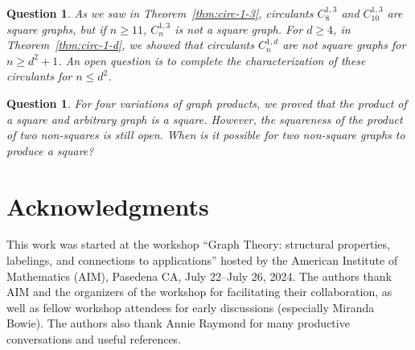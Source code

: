 \documentclass{article}
\newtheorem{ques}[theorem]{Question}
\theoremstyle{definition}
\begin{document}
\begin{ques} 
As we saw in Theorem~\ref{thm:circ-1-3}, circulants $C_8^{1,3}$ and $C_{10}^{1,3}$ are square graphs, but if $n\geq 11$, $C_{n}^{1,3}$ is not a square graph. 
For $d\geq 4$, in Theorem~\ref{thm:circ-1-d}, we showed that circulants $C_n^{1,d}$ are not square graphs for $n\geq d^2+1$. An open question is to complete the characterization of these circulants for $n\leq d^2$. 
\end{ques}

\begin{ques}
For four variations of graph products, we proved that the product of a square and arbitrary graph is a square.  However, the squareness of the product of two non-squares is still open.  When is it possible for two non-square graphs to produce a square?
\end{ques}




\section*{Acknowledgments}
This work was started at the workshop ``Graph Theory: structural properties, labelings, and connections to applications'' hosted by the American Institute of Mathematics (AIM), Pasedena CA, July 22--July 26, 2024. The authors thank AIM and the organizers of the workshop for facilitating their collaboration, as well as fellow workshop attendees for early discussions (especially Miranda Bowie).  The authors also thank Annie Raymond for many productive conversations and useful references. 

%

\end{document}

